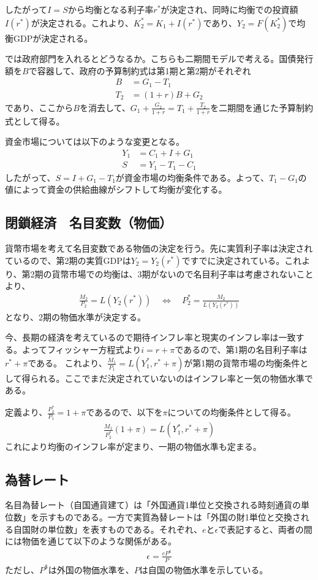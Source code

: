 \documentclass{jsarticle}
\begin{document}
したがって$I = S$から均衡となる利子率$r^*$が決定され、同時に均衡での投資額$I(r^*)$が決定される。これより、$K_2^* = K_1 + I(r^*)$であり、$Y_2 = F(K_2^*)$で均衡GDPが決定される。

では政府部門を入れるとどうなるか。こちらも二期間モデルで考える。国債発行額を$B$で容器して、政府の予算制約式は第1期と第2期がそれぞれ
\begin{align}
	B &= G_1 - T_1\\
	T_2 &= (1+r)B + G_2
\end{align}
であり、ここから$B$を消去して、$G_1 + \frac{G_2}{1 + r} = T_1 + \frac{T_2}{1 + r}$を二期間を通じた予算制約式として得る。

資金市場については以下のような変更となる。
\begin{align}
	Y_1 &= C_1 + I + G_1\\
	S &= Y_1 - T_1 - C_1
\end{align}
したがって、$S = I + G_1 - T_1$が資金市場の均衡条件である。よって、$T_1 - G_1$の値によって資金の供給曲線がシフトして均衡が変化する。

\subsection{閉鎖経済　名目変数（物価）}
貨幣市場を考えて名目変数である物価の決定を行う。先に実質利子率は決定されているので、第2期の実質GDPは$Y_2 = Y_2(r^*)$ですでに決定されている。これより、第2期の貨幣市場での均衡は、3期がないので名目利子率は考慮されないことより、
\begin{align}
	\frac{M_2}{P_2} = L(Y_2(r^*))\quad \Leftrightarrow \quad P_2^* = \frac{M_2}{L(Y_2(r^*))}
\end{align}
となり、2期の物価水準が決定する。

今、長期の経済を考えているので期待インフレ率と現実のインフレ率は一致する。よってフィッシャー方程式より$i = r + \pi$であるので、第1期の名目利子率は$r^* + \pi$である。
これより、$\frac{M_1}{P_1} = L(Y_1^*, r^* + \pi)$が第1期の貨幣市場の均衡条件として得られる。ここでまだ決定されていないのはインフレ率と一気の物価水準である。

定義より、$\frac{P_2^*}{P_1} = 1 + \pi$であるので、以下を$\pi$についての均衡条件として得る。
\begin{align}
	\frac{M_1}{P_2^*}(1 + \pi) = L(Y_1^*, r^* + \pi)
\end{align}
これにより均衡のインフレ率が定まり、一期の物価水準も定まる。

\subsection{為替レート}
名目為替レート（自国通貨建て）は「外国通貨1単位と交換される時刻通貨の単位数」を示すものである。一方で実質為替レートは「外国の財1単位と交換される自国財の単位数」を表すものである。それぞれ、$e$と$\epsilon$で表記すると、両者の間には物価を通じて以下のような関係がある。
\begin{align}
	\epsilon = \frac{eP^{\$}}{P}
\end{align}
ただし、$P^{\$}$は外国の物価水準を、$P$は自国の物価水準を示している。
\end{document}
